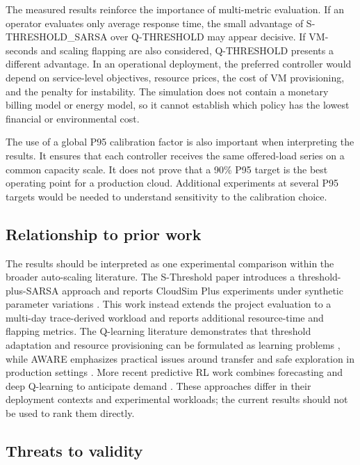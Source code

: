 \documentclass[pdflatex,sn-mathphys-num]{sn-jnl}
\begin{document}
The measured results reinforce the importance of multi-metric evaluation. If an operator evaluates only average response time, the small advantage of S-THRESHOLD\_SARSA over Q-THRESHOLD may appear decisive. If VM-seconds and scaling flapping are also considered, Q-THRESHOLD presents a different advantage. In an operational deployment, the preferred controller would depend on service-level objectives, resource prices, the cost of VM provisioning, and the penalty for instability. The simulation does not contain a monetary billing model or energy model, so it cannot establish which policy has the lowest financial or environmental cost.

The use of a global P95 calibration factor is also important when interpreting the results. It ensures that each controller receives the same offered-load series on a common capacity scale. It does not prove that a 90\% P95 target is the best operating point for a production cloud. Additional experiments at several P95 targets would be needed to understand sensitivity to the calibration choice.

\subsection{Relationship to prior work}

The results should be interpreted as one experimental comparison within the broader auto-scaling literature. The S-Threshold paper introduces a threshold-plus-SARSA approach and reports CloudSim Plus experiments under synthetic parameter variations \cite{archana2025sthreshold}. This work instead extends the project evaluation to a multi-day trace-derived workload and reports additional resource-time and flapping metrics. The Q-learning literature demonstrates that threshold adaptation and resource provisioning can be formulated as learning problems \cite{song2024qlearning}, while AWARE emphasizes practical issues around transfer and safe exploration in production settings \cite{qiu2023aware}. More recent predictive RL work combines forecasting and deep Q-learning to anticipate demand \cite{lipari2025forecast}. These approaches differ in their deployment contexts and experimental workloads; the current results should not be used to rank them directly.

\subsection{Threats to validity}
\end{document}
